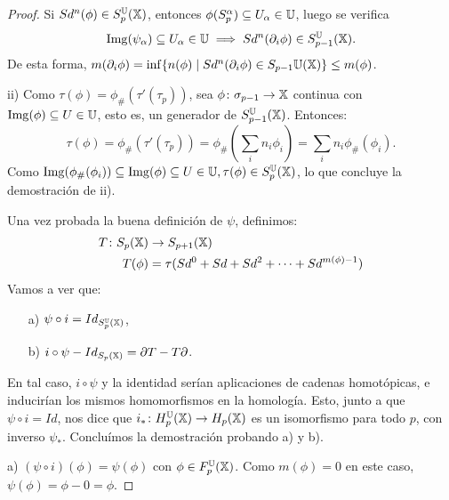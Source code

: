\begin{proof}
  Si $Sd^n(\phi) \in S_p^{\mathbb U}({\mathbb X})$, entonces $\phi(S_p^\alpha) \subseteq U_\alpha \in {\mathbb U}$, luego se verifica
  \[ \operatorname{Img}(\psi_\alpha) \subseteq U_\alpha \in {\mathbb U} \implies Sd^n(\partial_i \phi) \in S_{p-1}^{\mathbb U}({\mathbb X}). \]
  De esta forma, $m(\partial_i \phi) = \inf\{n(\phi) \mid Sd^n(\partial_i \phi) \in S_{p-1}{\mathbb U}({\mathbb X})\} \leq m(\phi)$.

  ii) Como $\tau(\phi) = \phi_\# (\tau'(\tau_p))$, sea $\phi \colon \sigma_{p-1} \to {\mathbb X}$ continua con $\operatorname{Img}(\phi) \subseteq U \in {\mathbb U}$, esto es,
  un generador de $S_{p-1}^{\mathbb U}({\mathbb X})$. Entonces:
  \[ \tau(\phi) = \phi_\#(\tau'(\tau_p)) = \phi_\#(\sum_i n_i \phi_i) = \sum_i n_i \phi_\#(\phi_i). \]
  Como $\operatorname{Img}(\phi_\#(\phi_i)) \subseteq \operatorname{Img}(\phi) \subseteq U \in {\mathbb U}, \tau(\phi) \in S_p^{\mathbb U}({\mathbb X})$, lo que concluye la demostración de ii).

  Una vez probada la buena definición de $\psi$, definimos:
  \begin{align*}
    T \colon S_p({\mathbb X}) &\to S_{p+1}({\mathbb X})  \\
    T(\phi) &= \tau(Sd^0 + Sd + Sd^2 + \dots + Sd^{m(\phi) - 1})
  \end{align*}
  Vamos a ver que:
  \begin{itemize}
    \item[a)] $\psi \circ i = Id_{S_p^{\mathbb U}({\mathbb X})}$,
    \item[b)] $i \circ \psi - Id_{S_{p}({\mathbb X})} = \partial T - T \partial$.
  \end{itemize}
  En tal caso, $i \circ \psi$ y la identidad serían aplicaciones de cadenas homotópicas, e inducirían los mismos homomorfismos en la homología.
  Esto, junto a que $\psi \circ i = Id$, nos dice que $i_* \colon H_p^{{\mathbb U}}({\mathbb X}) \to H_p({\mathbb X})$ es un isomorfismo para todo $p$, con inverso $\psi_*$.
  Concluímos la demostración probando a) y b).

  a) $(\psi \circ i)(\phi) = \psi(\phi)$ con $\phi \in F_p^{\mathbb U}({\mathbb X})$. Como $m(\phi) = 0$ en este caso, $\psi(\phi) = \phi - 0 = \phi$.


\end{proof}

